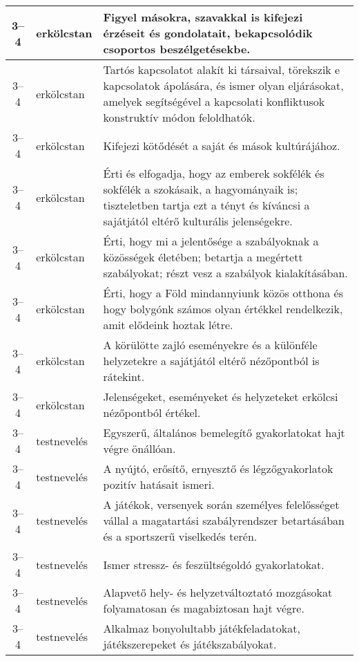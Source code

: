 \begin{small}
\begin{longtable}{c | p{2cm} |  p{11cm} }
              3--4 & erkölcstan & Figyel másokra, szavakkal is kifejezi érzéseit és gondolatait, bekapcsolódik csoportos beszélgetésekbe. \\ \hline
              3--4 & erkölcstan & Tartós kapcsolatot alakít ki társaival, törekszik e kapcsolatok ápolására, és ismer olyan eljárásokat, amelyek segítségével a kapcsolati konfliktusok konstruktív módon feloldhatók. \\ \hline
              3--4 & erkölcstan & Kifejezi kötődését a saját és mások kultúrájához. \\ \hline
              3--4 & erkölcstan & Érti és elfogadja, hogy az emberek sokfélék és sokfélék a szokásaik, a hagyományaik is; tiszteletben tartja ezt a tényt és kíváncsi a sajátjától eltérő kulturális jelenségekre. \\ \hline
              3--4 & erkölcstan & Érti, hogy mi a jelentősége a szabályoknak a közösségek életében; betartja a megértett szabályokat; részt vesz a szabályok kialakításában. \\ \hline
              3--4 & erkölcstan & Érti, hogy a Föld mindannyiunk közös otthona és hogy bolygónk számos olyan értékkel rendelkezik, amit elődeink hoztak létre. \\ \hline
              3--4 & erkölcstan & A körülötte zajló eseményekre és a különféle helyzetekre a sajátjától eltérő nézőpontból is rátekint. \\ \hline
              3--4 & erkölcstan & Jelenségeket, eseményeket és helyzeteket erkölcsi nézőpontból értékel. \\ \hline
              3--4 & testnevelés & Egyszerű, általános bemelegítő gyakorlatokat hajt végre önállóan. \\ \hline
              3--4 & testnevelés & A nyújtó, erősítő, ernyesztő és légzőgyakorlatok pozitív hatásait ismeri. \\ \hline
              3--4 & testnevelés & A játékok, versenyek során személyes felelősséget vállal a magatartási szabályrendszer betartásában és a sportszerű viselkedés terén. \\ \hline
              3--4 & testnevelés & Ismer stressz- és feszültségoldó gyakorlatokat. \\ \hline
              3--4 & testnevelés & Alapvető hely- és helyzetváltoztató mozgásokat folyamatosan és magabiztosan hajt végre. \\ \hline
              3--4 & testnevelés & Alkalmaz bonyolultabb játékfeladatokat, játékszerepeket és játékszabályokat. \\ \hline

\end{longtable}
\end{small}
